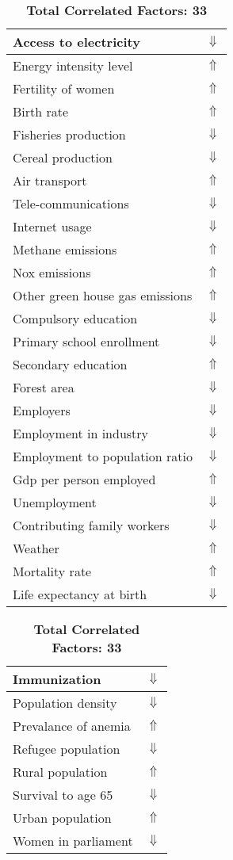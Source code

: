 \documentclass[12pt,notitlepage,oneside]{report}
\begin{document}
\begin{table}[!htb]
\caption{\textbf{Is Carried By: Bat $\Uparrow$}}
\centering
\label{Correlated Socio-economic Factors0}
\begin{tabular}{|l|l|}
\hline
Access to electricity & $\Downarrow$\\ \hline
Energy intensity level & $\Uparrow$\\ \hline
Fertility of women & $\Uparrow$\\ \hline
Birth rate & $\Uparrow$\\ \hline
Fisheries production & $\Downarrow$\\ \hline
Cereal production & $\Downarrow$\\ \hline
Air transport  & $\Uparrow$\\ \hline
Tele-communications & $\Downarrow$\\ \hline
Internet usage & $\Downarrow$\\ \hline
Methane emissions & $\Uparrow$\\ \hline
Nox emissions & $\Uparrow$\\ \hline
Other green house gas emissions & $\Uparrow$\\ \hline
Compulsory education & $\Downarrow$\\ \hline
Primary school enrollment & $\Downarrow$\\ \hline
Secondary education & $\Uparrow$\\ \hline
Forest area & $\Downarrow$\\ \hline
Employers & $\Downarrow$\\ \hline
Employment in industry & $\Downarrow$\\ \hline
Employment to population ratio & $\Downarrow$\\ \hline
Gdp per person employed & $\Uparrow$\\ \hline
Unemployment & $\Downarrow$\\ \hline
Contributing family workers & $\Downarrow$\\ \hline
Weather & $\Uparrow$\\ \hline
Mortality rate & $\Uparrow$\\ \hline
Life expectancy at birth & $\Downarrow$\\ \hline
\end{tabular}
\begin{tabular}{|l|l|}
\hline
Immunization & $\Downarrow$\\ \hline
Population density & $\Downarrow$\\ \hline
Prevalance of anemia & $\Uparrow$\\ \hline
Refugee population & $\Downarrow$\\ \hline
Rural population & $\Uparrow$\\ \hline
Survival to age 65 & $\Downarrow$\\ \hline
Urban population & $\Uparrow$\\ \hline
Women in parliament & $\Downarrow$\\ \hline
\end{tabular}
\caption*{\textbf{Total Correlated Factors: 33}}
\end{table}
\end{document}
